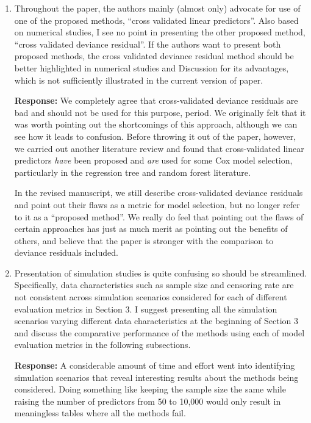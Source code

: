 \documentclass{article}
\newcommand{\re}{\textbf{Response: }}
\begin{document}
\begin{enumerate}[align = left]
\item Throughout the paper, the authors mainly (almost only) advocate for use of one of the proposed methods, “cross validated linear predictors”. Also based on numerical studies, I see no point in presenting the other proposed method, “cross validated deviance residual”. If the authors want to present both proposed methods, the cross validated deviance residual method should be better highlighted in numerical studies and Discussion for its advantages, which is not sufficiently illustrated in the current version of paper.

  \re We completely agree that cross-validated deviance residuals are bad and should not be used for this purpose, period. We originally felt that it was worth pointing out the shortcomings of this approach, although we can see how it leads to confusion. Before throwing it out of the paper, however, we carried out another literature review and found that cross-validated linear predictors \emph{have} been proposed and \emph{are} used for some Cox model selection, particularly in the regression tree and random forest literature.

  In the revised manuscript, we still describe cross-validated deviance residuals and point out their flaws as a metric for model selection, but no longer refer to it as a ``proposed method''. We really do feel that pointing out the flaws of certain approaches has just as much merit as pointing out the benefits of others, and believe that the paper is stronger with the comparison to deviance residuals included.

\item Presentation of simulation studies is quite confusing so should be streamlined. Specifically, data characteristics such as sample size and censoring rate are not consistent across simulation scenarios considered for each of different evaluation metrics in Section 3. I suggest presenting all the simulation scenarios varying different data characteristics at the beginning of Section 3 and discuss the comparative performance of the methods using each of model evaluation metrics in the following subsections.

  \re A considerable amount of time and effort went into identifying simulation scenarios that reveal interesting results about the methods being considered. Doing something like keeping the sample size the same while raising the number of predictors from 50 to 10,000 would only result in meaningless tables where all the methods fail.


\end{enumerate}
\end{document}
